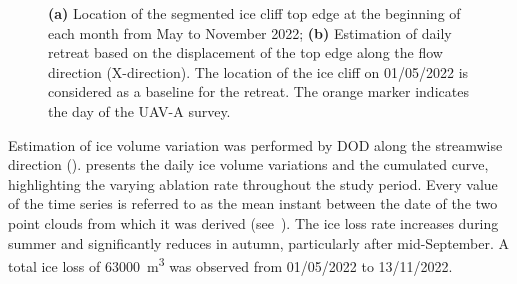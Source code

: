 \begin{figure}
  \centering
  \caption{\textbf{(a)} Location of the segmented ice cliff top edge at the beginning of each month from May to November 2022; \textbf{(b)} Estimation of daily retreat based on the displacement of the top edge along the flow direction (X-direction). The location of the ice cliff on 01/05/2022 is considered as a baseline for the retreat. The orange marker indicates the day of the UAV-A survey.}
  \label{fig:4:retreat}
\end{figure}

Estimation of ice volume variation was performed by DOD along the
streamwise direction ().
 presents the daily ice volume variations and the cumulated
curve, highlighting the varying ablation rate throughout the study period.
Every value of the time series is referred to as the mean instant between the date of the two point clouds from which it was derived (see~).
The ice loss rate increases during summer and significantly reduces in autumn,
particularly after mid-September.
A total ice loss of \SI{63000}{\cubic\meter} was observed from 01/05/2022 to 13/11/2022.

